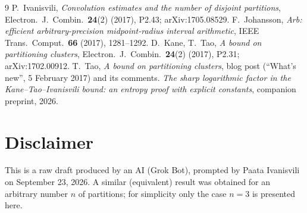 \documentclass[11pt]{article}
\theoremstyle{definition}
\numberwithin{equation}{section}
\begin{document}
\begin{thebibliography}{9}
 P.~Ivanisvili, \emph{Convolution estimates and the number of disjoint partitions}, Electron.\ J.\ Combin.\ \textbf{24}(2)
(2017), P2.43; arXiv:1705.08529.
 F.~Johansson, \emph{Arb: efficient arbitrary-precision midpoint-radius interval arithmetic}, IEEE Trans.\ Comput.\
\textbf{66} (2017), 1281--1292.
 D.~Kane, T.~Tao, \emph{A bound on partitioning clusters}, Electron.\ J.\ Combin.\ \textbf{24}(2) (2017), P2.31;
arXiv:1702.00912.
 T.~Tao, \emph{A bound on partitioning clusters}, blog post (``What's new'', 5 February 2017) and its comments.
\bibitem{P} \emph{The sharp logarithmic factor in the Kane--Tao--Ivanisvili bound: an entropy proof with explicit constants},
companion preprint, 2026.
\end{thebibliography}

\section*{Disclaimer}
This is a raw draft produced by an AI (Grok Bot), prompted by Paata Ivanisvili on September 23, 2026. A similar (equivalent)
result was obtained for an arbitrary number $n$ of partitions; for simplicity only the case $n=3$ is presented here.
\end{document}
